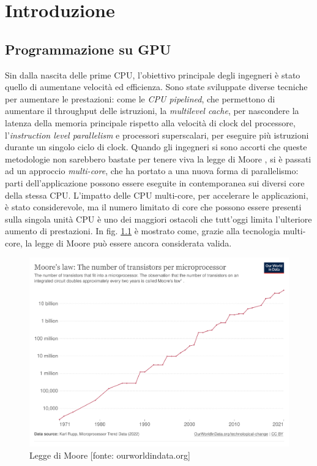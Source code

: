 \chapter{Introduzione}
\label{sec:intro}

\section[Programmazione su GPU]{Programmazione su GPU}

Sin dalla nascita delle prime \gls{CPU}, l'obiettivo principale degli ingegneri è stato quello di aumentane velocità ed efficienza. Sono state sviluppate diverse tecniche per aumentare le prestazioni: come le \textit{\gls{CPU} pipelined}, che permettono di aumentare il throughput delle istruzioni, la \textit{multilevel cache}, per nascondere la latenza della memoria principale rispetto alla velocità di clock del processore, l'\textit{instruction level parallelism} e processori superscalari, per eseguire più istruzioni durante un singolo ciclo di clock.
Quando gli ingegneri si sono accorti che queste metodologie non sarebbero bastate per tenere viva la legge di Moore \cite[]{Moore:law}, si è passati ad un approccio \textit{multi-core}, che ha portato a una nuova forma di parallelismo: parti dell'applicazione possono essere eseguite in contemporanea sui diversi core della stessa \gls{CPU}. L'impatto delle \gls{CPU} multi-core, per accelerare le applicazioni, è stato considerevole, ma il numero limitato di core che possono essere presenti sulla singola unità \gls{CPU} è uno dei maggiori ostacoli che tutt'oggi limita l'ulteriore aumento di prestazioni. In fig. \ref{fig:moore_law} è mostrato come, grazie alla tecnologia multi-core, la legge di Moore può essere ancora considerata valida.

\begin{figure}[ht]
\centering
\includegraphics[width=.9\linewidth]{images/chapter1/moore_law.png}
\caption{Legge di Moore [fonte: ourworldindata.org]}
\label{fig:moore_law}
\end{figure}


